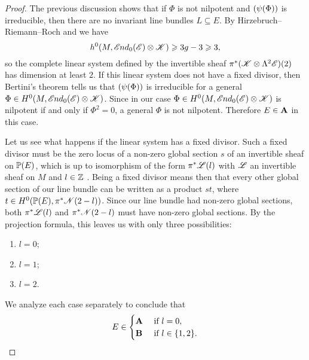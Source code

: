\documentclass[A4paper, 12pt, british, reqno]{amsart}
\let\div\relax
\DeclareMathOperator{\div}{div}
\newcommand{\ot}{\otimes}
\begin{document}
\begin{lm}
\begin{proof}
	The previous discussion shows that if $\Phi$ is not nilpotent and $\div(\psi(\Phi))$ is irreducible, then there are no invariant line bundles $L\subseteq E$.
	By Hirzebruch--Riemann--Roch and  we have
	\[ h^{0}(M,\sEnd_{0}(\E)\ot \sK)\geqslant 3g-3\geqslant 3, \]
	so the complete linear system defined by the invertible sheaf $\pi^{*}(\sK\ot\Lambda^{2}\E)(2)$ has dimension at least $2$.
	If this linear system does not have a fixed divisor, then Bertini's theorem \cite[Theorem 7.19]{iit82} tells us that $\div(\psi(\Phi))$ is irreducible for a general $\Phi\in H^{0}(M,\sEnd_{0}(\E)\ot \sK)$.
	Since in our case $\Phi\in H^{0}(M,\sEnd_{0}(\E)\ot \sK)$ is nilpotent if and only if $\Phi^{2}=0$, a general $\Phi$ is not nilpotent.
	Therefore $E\in \bfA$ in this case.

	Let us see what happens if the linear system has a fixed divisor.
	Such a fixed divisor must be the zero locus of a non-zero global section $s$ of an invertible sheaf on $\P(E)$, which is up to isomorphism of the form $\pi^{*}\L(l)$ with $\L$ an invertible sheaf on $M$ and $l\in \Z$ \cite[Exercise II.7.9]{har77}.
	Being a fixed divisor means then that every other global section of our line bundle can be written as a product $st$, where $t\in H^{0}(\P(E),\pi^{*}\sN(2-l))$.
	Since our line bundle had non-zero global sections, both $\pi^{*}\L(l)$ and $\pi^{*}\sN(2-l)$ must have non-zero global sections.
	By the projection formula, this leaves us with only three possibilities:
	\begin{enumerate}[label=\alph*)]
	    \item $l=0$;
	    \item $l=1$;
	    \item $l=2$.
	\end{enumerate}
	We analyze each case separately to conclude that
	\[ E\in \begin{cases} \bfA & \text{ if }l=0, \\
	    \bfB & \text{ if }l\in \{1,2\}.
	\end{cases} \]


\end{proof}
\end{lm}
\end{document}
